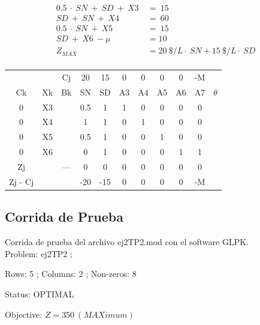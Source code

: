 \documentclass[a4paper,10pt]{article}
\begin{document}
\begin{align*}
0.5\ \cdot \ SN\ +\ SD \ +\ X3 \ &= \ 15  \\
SD\ +\ SN \ +\ X4 \ &= \ 60  \\
0.5\ \cdot \ SN\ +\ X5 \ &= \ 15  \\
SD \ +\ X6 \ - \mu \ &= 10  \\
Z_{MAX} &= 20 \ \$/L \cdot \ SN + 15 \ \$/L \cdot \ SD \\
\end{align*}

\begin{center}
 \begin{tabular}{| c c c | c  c  c  c  c  c  c  c |}
    \hline
     	&  	  &   Cj   &   20     &   15   &   0    &   0   &   0     &   0      &   -M    	   	&	       \\ 
    Ck 	&   Xk    &   Bk   &   SN    &   SD    &   A3   &   A4   &   A5   &   A6   &   A7		&  $\theta$    \\ \hline
    0   &   X3    &        &   0.5   &   1     &   1    &   0    &   0   &   0   &   0   			&    		\\
    0 	&   X4    &        &   1     &   1     &   0    &   1    &   0   &   0   &   0   			& 	        \\ 
    0 	&   X5    &        &    0.5  &   1     &   0    &   0    &   1   &   0   &   0   			&    		\\ 
    0 	&   X6    &   	    &   0     &   1     &   0    &   0    &   0   &   1   &   1   			&    		\\ \hline
    Zj 	&         & ---    &   0     &   0     &   0    &   0    &   0   &   0   &   0    	&    		\\ 
    Zj - Cj 	  &        &         &   -20   &   -15   &   0   &   0   &   0   &   0    		&   -M   &    \\ 
    \hline
 \end{tabular}
\end{center}

\subsection{Corrida de Prueba}
Corrida de prueba del archivo ej2TP2.mod con el software GLPK.\\


Problem:     ej2TP2 ;

Rows:        5  ; Columns:     2 ; Non-zeros:   8 

Status:      OPTIMAL 

Objective:   $Z    =   350 \   (MAXimum) $
\end{document}
